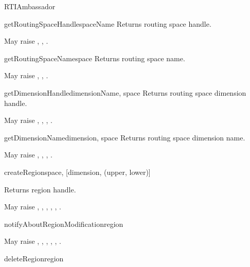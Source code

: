 \begin{classdesc}{RTIAmbassador}{}
\begin{methoddesc}{getRoutingSpaceHandle}{spaceName}
Returns routing space handle.

May raise
,
,
.
\end{methoddesc}

\begin{methoddesc}{getRoutingSpaceName}{space}
Returns routing space name.

May raise
,
,
.
\end{methoddesc}

\begin{methoddesc}{getDimensionHandle}{dimensionName, space}
Returns routing space dimension handle.

May raise
,
,
,
.
\end{methoddesc}

\begin{methoddesc}{getDimensionName}{dimension, space}
Returns routing space dimension name.

May raise
,
,
,
.
\end{methoddesc}

\begin{methoddesc}{createRegion}{space, [dimension, (upper, lower)]}

Returns region handle.

May raise
,
,
,
,
,
.
\end{methoddesc}

\begin{methoddesc}{notifyAboutRegionModification}{region}

May raise
,
,
,
,
,
.
\end{methoddesc}

\begin{methoddesc}{deleteRegion}{region}


\end{methoddesc}
\end{classdesc}
